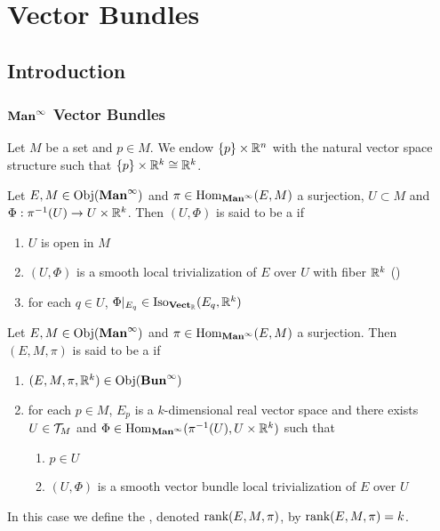\documentclass{book}
\begin{document}
	\newpage
	\chapter{Vector Bundles}
	
	\section{Introduction}
	
	\subsection{$\operatorname*{\text{\textbf{Man}}^{\infty}}$ Vector Bundles}

	\begin{note}
		Let $M$ be a set and $p \in M$. We endow $\{p\} \times \mathbb{R}^n$ with the natural vector space structure such that $\{p\} \times \mathbb{R}^k \cong \mathbb{R}^k$.
	\end{note}

	\begin{defn} 
		Let $E, M \in \operatorname{Obj}(\operatorname*{\text{\textbf{Man}}^{\infty}})$ and $\pi \in \operatorname{Hom}_{\operatorname*{\text{\textbf{Man}}^{\infty}}}(E, M)$ a surjection, $U \subset M$ and $\Phi: \pi^{-1}(U) \rightarrow U \times \mathbb{R}^k$. Then $(U, \Phi)$ is said to be a   if 
		\begin{enumerate}
			\item $U$ is open in $M$
			\item $(U, \Phi)$ is a smooth local trivialization of $E$ over $U$ with fiber $\mathbb{R}^k$ ()
			\item for each $q \in U$, $\Phi|_{E_q} \in \operatorname{Iso}_{\operatorname*{\text{\textbf{Vect}}_{\mathbb{R}}}}(E_q , \mathbb{R}^k)$
		\end{enumerate}
	\end{defn}

	\begin{defn} 
		Let $E,M \in \operatorname{Obj}(\operatorname*{\text{\textbf{Man}}^{\infty}})$ and $\pi \in \operatorname{Hom}_{\operatorname*{\text{\textbf{Man}}^{\infty}}}(E, M)$ a surjection. Then $(E, M, \pi)$ is said to be a  if 
		\begin{enumerate}
			\item $(E, M, \pi, \mathbb{R}^k) \in \operatorname{Obj}(\operatorname*{\text{\textbf{Bun}}^{\infty}})$
			\item for each $p \in M$, $E_p$ is a $k$-dimensional real vector space and there exists $U \in \mathcal{T}_M$ and $\Phi \in \operatorname{Hom}_{\operatorname*{\text{\textbf{Man}}^{\infty}}}(\pi^{-1}(U), U \times \mathbb{R}^k)$ such that
			\begin{enumerate}
				\item $p \in U$
				\item $(U, \Phi)$ is a smooth vector bundle local trivialization of $E$ over $U$ 
			\end{enumerate}
		\end{enumerate}
		In this case we define the , denoted $\operatorname{\text{rank}} (E, M, \pi)$, by $ \operatorname{\text{rank}} (E, M, \pi) = k$.
	\end{defn}
\end{document}
